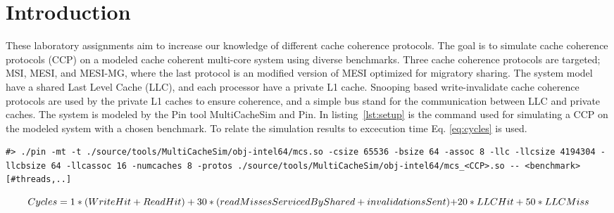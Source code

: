 \section{Introduction}
\label{sec:int}
These laboratory assignments aim to increase our knowledge of different cache coherence protocols. The goal is to simulate cache coherence protocols (CCP) on a modeled cache coherent multi-core system using diverse benchmarks. Three cache coherence protocols are targeted; MSI, MESI, and MESI-MG, where the last protocol is an modified version of MESI optimized for migratory sharing. The system model have a shared Last Level Cache (LLC), and each processor have a private L1 cache. Snooping based write-invalidate cache coherence protocols are used by the private L1 caches to ensure coherence, and a simple bus stand for the communication between LLC and private caches. The system is modeled by the Pin tool MultiCacheSim and Pin. In listing~\ref{lst:setup} is the command used for simulating a CCP on the modeled system with a chosen benchmark. To relate the simulation results to excecution time Eq. \ref{eq:cycles} is used. 



\begin{lstlisting}[label=lst:setup, basicstyle=\scriptsize, caption={Command used for simulation.}]
#> ./pin -mt -t ./source/tools/MultiCacheSim/obj-intel64/mcs.so -csize 65536 -bsize 64 -assoc 8 -llc -llcsize 4194304 -llcbsize 64 -llcassoc 16 -numcaches 8 -protos ./source/tools/MultiCacheSim/obj-intel64/mcs_<CCP>.so -- <benchmark> [#threads,..]
\end{lstlisting}

\begin{equation}
	$$\label{eq:cycles}$$
	Cycles = 1 * (WriteHit+ReadHit) + 30 * (readMissesServicedByShared + invalidationsSent)$$ $$+ 20 * LLCHit + 50 * LLCMiss
\end{equation}